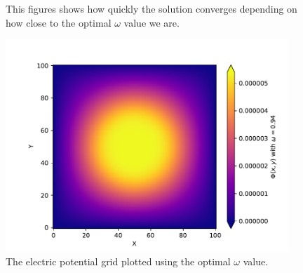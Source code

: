 \documentclass{article}
\begin{document}
\begin{enumerate}
{\begin{enumerate}
{\begin{figure}[h!]
            \caption{This figures shows how quickly the solution converges depending on how close to the optimal $\omega$ value we are.}
            \label{fig:my_label}
        \end{figure}
        \begin{figure}[htp]
            \centering
            \includegraphics[width=\textwidth, height=8cm]{golden_phi.pdf}
            \caption{The electric potential grid plotted using the optimal $\omega$ value.}
            \label{fig:my_label}
        \end{figure}}
    \end{enumerate}
    }
\end{enumerate}
\end{document}
